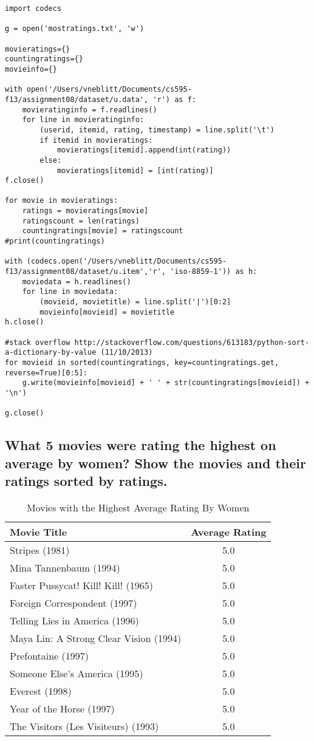 \documentclass{article}
\begin{document}
\begin{lstlisting}[frame=single, caption=mostratings.py, label=mostratings]
import codecs

g = open('mostratings.txt', 'w')

movieratings={}
countingratings={}
movieinfo={}

with open('/Users/vneblitt/Documents/cs595-f13/assignment08/dataset/u.data', 'r') as f:
	movieratinginfo = f.readlines()
	for line in movieratinginfo:
		(userid, itemid, rating, timestamp) = line.split('\t')
		if itemid in movieratings:
			movieratings[itemid].append(int(rating))
		else:
			movieratings[itemid] = [int(rating)]
f.close()

for movie in movieratings:
	ratings = movieratings[movie]
	ratingscount = len(ratings)
	countingratings[movie] = ratingscount
#print(countingratings)

with (codecs.open('/Users/vneblitt/Documents/cs595-f13/assignment08/dataset/u.item','r', 'iso-8859-1')) as h:
	moviedata = h.readlines()
	for line in moviedata:
		(movieid, movietitle) = line.split('|')[0:2]
		movieinfo[movieid] = movietitle
h.close()

#stack overflow http://stackoverflow.com/questions/613183/python-sort-a-dictionary-by-value (11/10/2013)
for movieid in sorted(countingratings, key=countingratings.get, reverse=True)[0:5]:
	g.write(movieinfo[movieid] + ' ' + str(countingratings[movieid]) + '\n')

g.close()
\end{lstlisting}

\newpage
\subsection{What 5 movies were rating the highest on average by women? Show the movies and their ratings sorted by ratings.}

\begin{table}[!h]
\centering
\begin{tabular}{l c}
Movie Title & Average Rating \\
\hline
Stripes (1981) & 5.0  \\
Mina Tannenbaum (1994) & 5.0  \\
Faster Pussycat! Kill! Kill! (1965) & 5.0  \\
Foreign Correspondent (1997) & 5.0  \\
Telling Lies in America (1996) & 5.0  \\
Maya Lin: A Strong Clear Vision (1994) & 5.0  \\
Prefontaine (1997) & 5.0  \\
Someone Else's America (1995) & 5.0  \\
Everest (1998) & 5.0  \\
Year of the Horse (1997) & 5.0  \\
The Visitors (Les Visiteurs) (1993) & 5.0 \\
\hline
\end{tabular}
\caption{Movies with the Highest Average Rating By Women}
\end{table}
\end{document}
